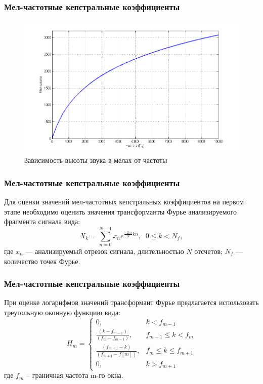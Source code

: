 \documentclass[slidestop, compress, mathserif, blackandwhite, utf8, serif, slidescentered]{beamer}
\begin{document}
\begin{frame}[plain]
	\frametitle{Мел-частотные кепстральные коэффициенты}
	
	\begin{figure}[h]
		\centering
		\includegraphics[width=.8\textwidth]{mel-scale.png}
		\caption{Зависимость высоты звука в мелах от частоты}
		\label{mfcc_number}
	\end{figure}

\end{frame}

\begin{frame}[plain]
	\frametitle{Мел-частотные кепстральные коэффициенты}
	Для оценки значений мел-частотных кепстральных коэффициентов на первом этапе необходимо оценить значения трансформанты Фурье анализируемого фрагмента сигнала вида:
	\begin{equation}
		X_{k} =\sum_{n=0}^{N-1}x_{n}e^{\frac{-2\pi i}{N} kn},  \;\; 0\le k<N_f,
	\end{equation}
	где  $x_n$ --- анализируемый отрезок сигнала, длительностью $N$ отсчетов; $N_f$ --- количество точек Фурье.
\end{frame}

\begin{frame}[plain]
	\frametitle{Мел-частотные кепстральные коэффициенты}
	При оценке логарифмов значений трансформант Фурье предлагается использовать треугольную оконную функцию вида:
	\begin{equation}
		H_{m}=
		\begin{cases}
			0,&k<f_{m-1}\\ 
			\frac{(k-f_{m-1})}{(f_{m}-f_{m-1})},&f_{m-1} \leq k < f_{m}\\ 
			\frac{(f_{m+1}-k)}{(f_{m+1}-f[m])},&f_{m} \leq k \leq f_{m+1}\\ 
			0,&k > f_{m+1}
		\end{cases}
		\label{eq:window}
	\end{equation}
	где $f_m$ – граничная частота m-го окна.

\end{frame}
\end{document}
